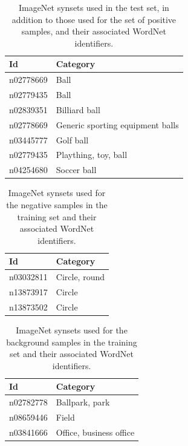 \documentclass{sig-alternate-05-2015}
\begin{document}
{{			\begin{table}
				\centering
				\caption{ImageNet synsets used in the test set, in addition to those used for the set of positive samples, and their associated WordNet identifiers.}
				\label{tab:test_set}
				\begin{tabularx}{\columnwidth}{@{}lX@{}}
					\toprule
					\textbf{Id} & \textbf{Category} \\
					\midrule
						n02778669 & Ball \\
						n02779435 & Ball \\
						n02839351 & Billiard ball \\
						n02778669 & Generic sporting equipment balls \\
						n03445777 & Golf ball \\
						n02779435 & Plaything, toy, ball \\
						n04254680 & Soccer ball \\
					\bottomrule
				\end{tabularx}
			\end{table}

			\begin{table}
				\centering
				\caption{ImageNet synsets used for the negative samples in the training set and their associated WordNet identifiers.}
				\label{tab:negative_samples}
				\begin{tabularx}{\columnwidth}{@{}lX@{}}
					\toprule
					\textbf{Id} & \textbf{Category} \\
					\midrule
						n03032811 & Circle, round \\
						n13873917 & Circle \\
						n13873502 & Circle \\
					\bottomrule
				\end{tabularx}
			\end{table}

			\begin{table}
				\centering
				\caption{ImageNet synsets used for the background samples in the training set and their associated WordNet identifiers.}
				\label{tab:background_samples}
				\begin{tabularx}{\columnwidth}{@{}lX@{}}
					\toprule
					\textbf{Id} & \textbf{Category} \\
					\midrule
						n02782778 & Ballpark, park \\
						n08659446 & Field \\
						n03841666 & Office, business office \\
					\bottomrule
				\end{tabularx}
			\end{table}

		}
	}
\end{document}
